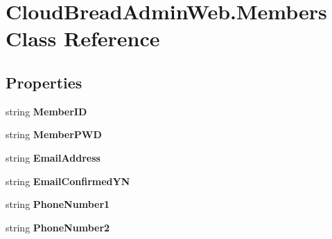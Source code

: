 \hypertarget{class_cloud_bread_admin_web_1_1_members}{}\section{Cloud\+Bread\+Admin\+Web.\+Members Class Reference}
\label{class_cloud_bread_admin_web_1_1_members}
\subsection*{Properties}
\begin{DoxyCompactItemize}
\item 
string {\bfseries Member\+ID}\hypertarget{class_cloud_bread_admin_web_1_1_members_a1ff6cf9453492e06f9b9d075b8030134}{}\label{class_cloud_bread_admin_web_1_1_members_a1ff6cf9453492e06f9b9d075b8030134}

\item 
string {\bfseries Member\+P\+WD}\hypertarget{class_cloud_bread_admin_web_1_1_members_aa121b33c7c2fce743dc112d1a67e2425}{}\label{class_cloud_bread_admin_web_1_1_members_aa121b33c7c2fce743dc112d1a67e2425}

\item 
string {\bfseries Email\+Address}\hypertarget{class_cloud_bread_admin_web_1_1_members_ad564f6dfced65aa59c7257e769508bf2}{}\label{class_cloud_bread_admin_web_1_1_members_ad564f6dfced65aa59c7257e769508bf2}

\item 
string {\bfseries Email\+Confirmed\+YN}\hypertarget{class_cloud_bread_admin_web_1_1_members_ae59291336e62f841e40ef2f1b843821b}{}\label{class_cloud_bread_admin_web_1_1_members_ae59291336e62f841e40ef2f1b843821b}

\item 
string {\bfseries Phone\+Number1}\hypertarget{class_cloud_bread_admin_web_1_1_members_a651e52f93801d9528eba1ed695b3d48c}{}\label{class_cloud_bread_admin_web_1_1_members_a651e52f93801d9528eba1ed695b3d48c}

\item 
string {\bfseries Phone\+Number2}\hypertarget{class_cloud_bread_admin_web_1_1_members_a918f402e46823f6c5bd07aff5110f49e}{}\label{class_cloud_bread_admin_web_1_1_members_a918f402e46823f6c5bd07aff5110f49e}


\end{DoxyCompactItemize}
